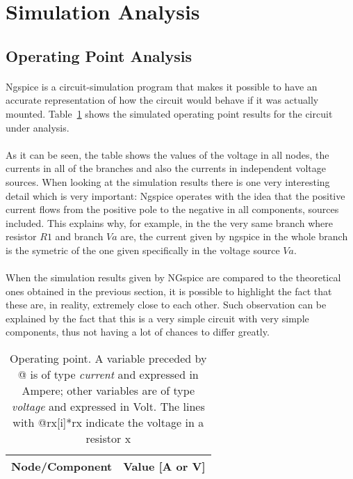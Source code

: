 \section{Simulation Analysis}
\label{sec:simulation}

\subsection{Operating Point Analysis}

\paragraph{}Ngspice is a circuit-simulation program that makes it possible to have an accurate representation of how the circuit would behave if it was actually mounted. Table~\ref{tab:op} shows the simulated operating point results for the circuit
under analysis.


\paragraph{}As it can be seen, the table shows the values of the voltage in all nodes, the currents in all of the branches and also the currents in independent voltage sources. When looking at the simulation results there is one very interesting detail which is very important: Ngspice operates with the idea that the positive current flows from the positive pole to the negative in all components, sources included. This explains why, for example, in the the very same branch where resistor $R1$ and branch $Va$ are, the current given by ngspice in the whole branch is the symetric of the one given specifically in the voltage source $Va$.


\paragraph{} When the simulation results given by NGspice are compared to the theoretical ones obtained in the previous section, it is possible to highlight the fact that these are, in reality, extremely close to each other. Such observation can be explained by the fact that this is a very simple circuit with very simple components, thus not having a lot of chances to differ greatly.


\begin{table}[h]
  \centering
  \begin{tabular}{|l|r|}
    \hline    
    {\bf Node/Component} & {\bf Value [A or V]} \\ \hline
    
  \end{tabular}
  \caption{Operating point. A variable preceded by @ is of type {\em current}
    and expressed in Ampere; other variables are of type {\it voltage} and expressed in
    Volt. The lines with @rx[i]*rx indicate the voltage in a resistor x}
  \label{tab:op}
\end{table}

